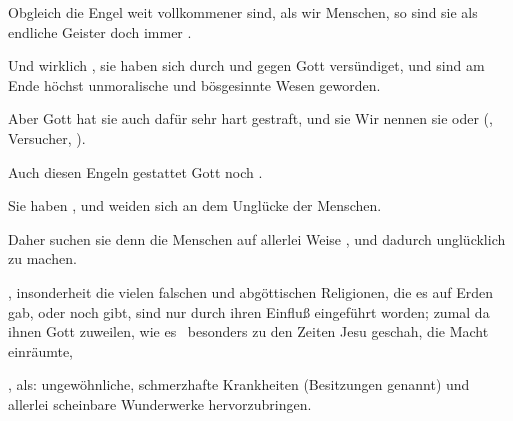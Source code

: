 \begin{aufza}
\begin{aufzb}
\end{aufzb}
\item Obgleich die Engel weit vollkommener sind, als wir Menschen, so sind sie als endliche Geister doch immer .
\begin{aufzb}
\item Und wirklich , sie haben sich durch  und  gegen Gott versündiget, und sind am Ende höchst unmoralische und bösgesinnte Wesen geworden.
\item Aber Gott hat sie auch dafür sehr hart gestraft, und sie  Wir nennen sie  oder  (, Versucher, ).
\end{aufzb}
\item Auch diesen Engeln gestattet Gott noch .
\begin{aufzb}
\item Sie haben , und weiden sich an dem Unglücke der Menschen.
\item Daher suchen sie denn die Menschen auf allerlei Weise , und dadurch unglücklich zu machen.
\item {}, insonderheit die vielen falschen und abgöttischen Religionen, die es auf Erden gab, oder noch gibt, sind nur durch ihren Einfluß eingeführt worden; zumal da ihnen Gott zuweilen, wie es \zB\ besonders zu den Zeiten Jesu geschah, die Macht einräumte,
\item {}, als: ungewöhnliche, schmerzhafte Krankheiten (Besitzungen genannt) und allerlei scheinbare Wunderwerke hervorzubringen.
\end{aufzb}
\end{aufza}


